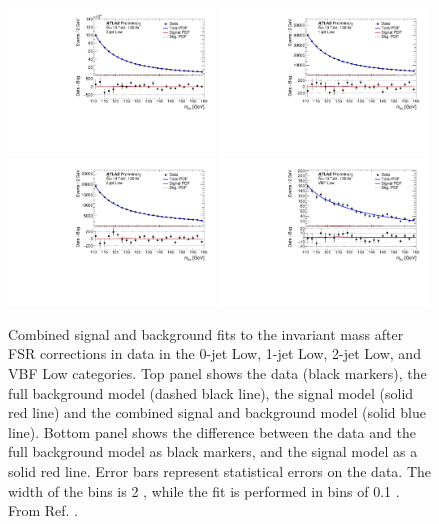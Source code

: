 \begin{figure}[h!]
  \centering
  \includegraphics[width=0.49\textwidth]{figures/hmumu/fits/BDT12}
  \includegraphics[width=0.49\textwidth]{figures/hmumu/fits/BDT9}
  \includegraphics[width=0.49\textwidth]{figures/hmumu/fits/BDT6}
  \includegraphics[width=0.49\textwidth]{figures/hmumu/fits/BDT3}
  \caption[Combined signal and background fit to data for Low categories]{
  Combined signal and background fits to the invariant mass after FSR
  corrections in data in the 0-jet Low, 1-jet Low, 2-jet Low,
  and VBF Low categories. Top panel shows the data (black
  markers), the full background model (dashed black line), the signal
  model (solid red line) and the combined signal and background model
  (solid blue line). Bottom panel shows the difference between the data
  and the full background model as black markers, and the signal model
  as a solid red line. Error bars represent statistical errors on
  the data. The width of the bins is 2 \GeV, while the fit is
  performed in bins of 0.1 \GeV.
  From Ref. \cite{ATLAS-CONF-2019-028}.
  }
  \label{fig:hmumu:fit-low}
\end{figure}


